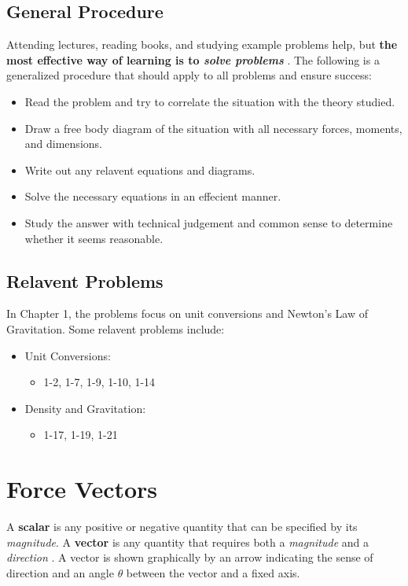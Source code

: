 \documentclass[12pt]{article}
\begin{document}
\subsection{General Procedure}
Attending lectures, reading books, and studying example problems help, but \textbf{the most effective way of learning is to \textit{solve problems}} \cite{hibbeler}.
The following is a generalized procedure that should apply to all problems and ensure success:
\begin{itemize}
    \item Read the problem and try to correlate the situation with the theory studied.
    \item Draw a free body diagram of the situation with all necessary forces, moments, and dimensions.
    \item Write out any relavent equations and diagrams.
    \item Solve the necessary equations in an effecient manner.
    \item Study the answer with technical judgement and common sense to determine whether it seems reasonable.
\end{itemize}

\subsection{Relavent Problems}
In Chapter 1, the problems focus on unit conversions and Newton's Law of Gravitation.
Some relavent problems include:
\begin{itemize}
    \item Unit Conversions:
    \begin{itemize}
        \item 1-2, 1-7, 1-9, 1-10, 1-14
    \end{itemize}
    \item Density and Gravitation:
    \begin{itemize}
        \item 1-17, 1-19, 1-21
    \end{itemize}
\end{itemize}

\pagebreak
\section{Force Vectors}
A \textbf{scalar} is any positive or negative quantity that can be specified by its \textit{magnitude}.
A \textbf{vector} is any quantity that requires both a \textit{magnitude} and a \textit{direction} \cite{buckham}.
A vector is shown graphically by an arrow indicating the sense of direction and an angle $\theta$ between the vector and a fixed axis.
\end{document}
